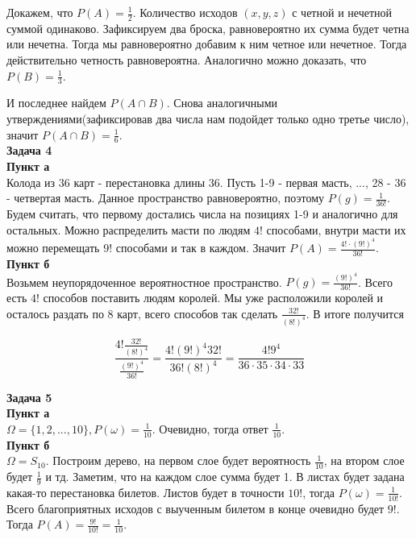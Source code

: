 Докажем, что $P(A) = \frac{1}{2}$. Количество исходов $(x, y, z)$ с четной и нечетной суммой одинаково. Зафиксируем два броска, равновероятно их сумма будет четна или нечетна. Тогда мы равновероятно добавим к ним четное
или нечетное. Тогда действительно четность равновероятна. Аналогично можно доказать, что $P(B) = \frac{1}{3}$.

И последнее найдем $P(A \cap B)$. Снова аналогичными утверждениями(зафиксировав два числа нам подойдет только одно третье число), значит $P(A \cap B) = \frac{1}{6}$.\\

\textbf{Задача 4}\\

\textbf{Пункт а}\\

Колода из 36 карт - перестановка длины 36. Пусть 1-9 - первая масть, ..., 28 - 36 - четвертая масть. Данное пространство равновероятно, поэтому
$P(g) = \frac{1}{36!}$. Будем считать, что первому достались числа на позициях 1-9 и аналогично для остальных. Можно распределить масти по людям
$4!$ способами, внутри масти их можно перемещать $9!$ способами и так в каждом. Значит $P(A) = \frac{4! \cdot (9!)^4}{36!}$.\\

\textbf{Пункт б}\\

Возьмем неупорядоченное вероятностное пространство. $P(g) = \frac{(9!)^4}{36!}$. Всего есть $4!$ способов поставить людям королей. Мы уже расположили королей
и осталось раздать по 8 карт, всего способов так сделать $\frac{32!}{(8!)^4}$. В итоге получится

\begin{equation*}
    \frac{4! \frac{32!}{(8!)^4}}{ \frac{(9!)^4}{36!}} = \frac{4! (9!)^4 32!}{36!(8!)^4} = \frac{4! 9^4}{36 \cdot 35 \cdot 34 \cdot 33}
\end{equation*}

\textbf{Задача 5}\\

\textbf{Пункт а}\\

$\Omega = \{1, 2, ..., 10\}, P(\omega) = \frac{1}{10}$. Очевидно, тогда ответ $\frac{1}{10}$.\\

\textbf{Пункт б}\\

$\Omega = S_{10}$. Построим дерево, на первом слое будет вероятность $\frac{1}{10}$, на втором слое будет $\frac{1}{9}$ и тд. Заметим, что на каждом слое
сумма будет 1. В листах будет задана какая-то перестановка билетов. Листов будет в точности $10!$, тогда $P(\omega) = \frac{1}{10!}$. Всего благоприятных исходов
с выученным билетом в конце очевидно будет $9!$. Тогда $P(A) = \frac{9!}{10!} = \frac{1}{10}$.\\

